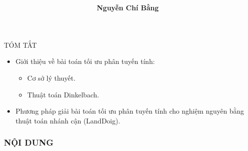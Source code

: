 \documentclass{beamer}
\title[]{\fontsize{13pt}{10pt}\selectfont {\bf \LARGE Tối ưu phân tuyến tính \\ cho nghiệm nguyên}\\}
\author[]{\bf Nguyễn Chí Bằng \\}
\begin{document}
\begin{frame}
    \titlepage
\end{frame}

\begin{frame}{TÓM TẮT}
\Large
\begin{itemize}
\item Giới thiệu về bài toán tối ưu phân tuyến tính:
\begin{itemize} \Large
\item Cơ sở lý thuyết.
\item Thuật toán Dinkelbach.
\end{itemize}
\item Phương pháp giải bài toán tối ưu phân tuyến tính cho nghiệm nguyên bằng thuật toán nhánh cận (LandDoig).
\end{itemize}
\end{frame}

\begin{frame}
    \frametitle{NỘI DUNG}
    \tableofcontents
\end{frame}
\end{document}
